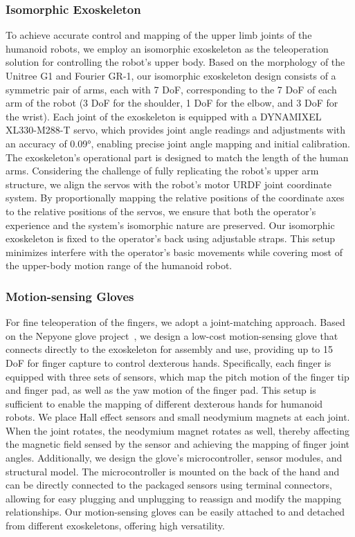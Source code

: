 \subsubsection{\textbf{Isomorphic Exoskeleton}}
To achieve accurate control and mapping of the upper limb joints of the humanoid robots, we employ an isomorphic exoskeleton as the teleoperation solution for controlling the robot's upper body. Based on the morphology of the Unitree G1 and Fourier GR-1, our isomorphic exoskeleton design consists of a symmetric pair of arms, each with 7 DoF, corresponding to the 7 DoF of each arm of the robot (3 DoF for the shoulder, 1 DoF for the elbow, and 3 DoF for the wrist). Each joint of the exoskeleton is equipped with a DYNAMIXEL XL330-M288-T servo, which provides joint angle readings and adjustments with an accuracy of 0.09°, enabling precise joint angle mapping and initial calibration. The exoskeleton's operational part is designed to match the length of the human arms. Considering the challenge of fully replicating the robot's upper arm structure, we align the servos with the robot's motor URDF joint coordinate system. By proportionally mapping the relative positions of the coordinate axes to the relative positions of the servos, we ensure that both the operator's experience and the  system's isomorphic nature are preserved. Our isomorphic exoskeleton is fixed to the operator's back using adjustable straps. This setup minimizes interfere with the operator's basic movements while covering most of the upper-body motion range of the humanoid robot.

\subsubsection{\textbf{Motion-sensing Gloves}}
For fine teleoperation of the fingers, we adopt a joint-matching approach. Based on the Nepyone glove project~\cite{Nepyope2023Project-Homunculus}, we design a low-cost motion-sensing glove that connects directly to the exoskeleton for assembly and use, providing up to 15 DoF for finger capture to control dexterous hands. Specifically, each finger is equipped with three sets of sensors, which map the pitch motion of the finger tip and finger pad, as well as the yaw motion of the finger pad. This setup is sufficient to enable the mapping of different dexterous hands for humanoid robots. We place Hall effect sensors and small neodymium magnets at each joint. When the joint rotates, the neodymium magnet rotates as well, thereby affecting the magnetic field sensed by the sensor and achieving the mapping of finger joint angles. Additionally, we design the glove's microcontroller, sensor modules, and structural model. The microcontroller is mounted on the back of the hand and can be directly connected to the packaged sensors using terminal connectors, allowing for easy plugging and unplugging to reassign and modify the mapping relationships. Our motion-sensing gloves can be easily attached to and detached from different exoskeletons, offering high versatility.

